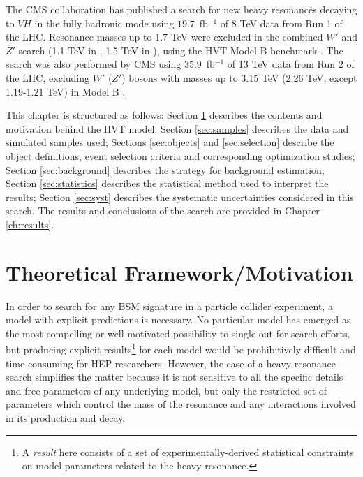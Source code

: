 The CMS collaboration has published a search for new heavy resonances decaying to $VH$ in the fully hadronic mode using $19.7$~fb$^{-1}$ of 8 TeV data from Run 1 of the LHC.
Resonance masses up to 1.7 TeV were excluded in the combined $W'$ and $Z'$ search (1.1 TeV in \zpzh, 1.5 TeV in \wpwh), using the HVT Model B benchmark \cite{Khachatryan:2015bma}.
The search was also performed by CMS using $35.9$~fb$^{-1}$ of 13 TeV data from Run 2 of the LHC, excluding $W'$ ($Z'$) bosons with masses up to 3.15 TeV (2.26 TeV, except 1.19-1.21 TeV) in Model B \cite{Sirunyan:2017wto}.

This chapter is structured as follows: Section \ref{sec:theory_overview} describes the contents and motivation behind the HVT model; Section \ref{sec:samples} describes the data and simulated samples used; Sections \ref{sec:objects} and \ref{sec:selection} describe the object definitions, event selection criteria and corresponding optimization studies; Section \ref{sec:background} describes the strategy for background estimation; Section \ref{sec:statistics} describes the statistical method used to interpret the results; Section \ref{sec:syst} describes the systematic uncertainties considered in this search.
The results and conclusions of the search are provided in Chapter \ref{ch:results}.

\section{Theoretical Framework/Motivation}
\label{sec:theory_overview}

In order to search for any BSM signature in a particle collider experiment, a model with explicit predictions is necessary.
No particular model has emerged as the most compelling or well-motivated possibility to single out for search efforts, but producing explicit results\footnote{A \textit{result} here consists of a set of experimentally-derived statistical constraints on model parameters related to the heavy resonance.} for each model would be prohibitively difficult and time consuming for HEP researchers.
However, the case of a heavy resonance search simplifies the matter because it is not sensitive to all the specific details and free parameters of any underlying model, but only the restricted set of parameters which control the mass of the resonance and any interactions involved in its production and decay.

